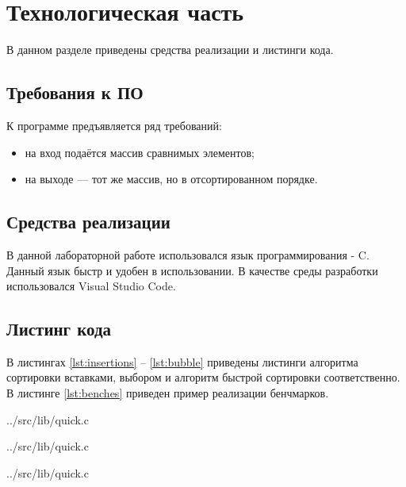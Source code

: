 \chapter{Технологическая часть}

В данном разделе приведены средства реализации и листинги кода.

\section{Требования к ПО}

К программе предъявляется ряд требований:
\begin{itemize}
	\item на вход подаётся массив сравнимых элементов;
	\item на выходе — тот же массив, но в отсортированном порядке.
\end{itemize}

\section{Средства реализации}

В данной лабораторной работе использовался язык программирования - C. Данный язык быстр и удобен в использовании. В качестве среды разработки использовался Visual Studio Code. 

\section{Листинг кода}

В листингах \ref{lst:insertions} -- \ref{lst:bubble} приведены листинги алгоритма сортировки вставками, выбором и алгоритм быстрой сортировки соответственно. В листинге \ref{lst:benches} приведен пример реализации бенчмарков.

\begin{lstinputlisting}[
	caption={Алгоритм сортировки вставками},
	label={lst:insertions},
	style={c},
	linerange={66-81}
]{../src/lib/quick.c}
\end{lstinputlisting}

\begin{lstinputlisting}[
	caption={Алгоритм сортировки выбором},
	label={lst:selection},
	style={c},
	linerange={83-97}
]{../src/lib/quick.c}
\end{lstinputlisting}



\begin{lstinputlisting}[
	caption={Алгоритм быстрой сортировки},
	label={lst:bubble},
	style={c},
	linerange={26-63}
]{../src/lib/quick.c}
\end{lstinputlisting}


